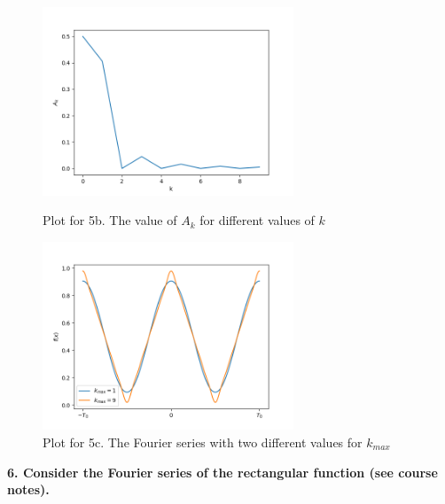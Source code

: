 \begin{figure}[H]
	\centering
	\begin{minipage}[c]{7.5cm}
		\includegraphics[width=7.5cm]{img/ex_5_b.png}
		\captionsetup{width=6cm}
		\caption{Plot for 5b. The value of $A_k$ for different values of $k$}
	\end{minipage}
	\begin{minipage}[c]{7.5cm}
		\includegraphics[width=7.5cm]{img/ex_5_c.png}
		\captionsetup{width=6cm}
		\caption{Plot for 5c. The Fourier series with two different values for $k_{max}$}
	\end{minipage}
\end{figure}

\newpage

\textbf{\large 6. Consider the Fourier series of the rectangular function (see course notes).}





